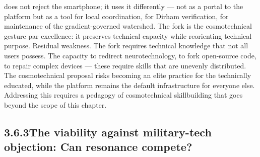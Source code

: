 does not reject the smartphone; it uses it differently — not as a portal to the platform but as a tool for local coordination, for Dirham verification, for maintenance of the gradient-governed watershed. The fork is the cosmotechnical gesture par excellence: it preserves technical capacity while reorienting technical purpose. Residual weakness. The fork requires technical knowledge that not all users possess. The capacity to redirect neurotechnology, to fork open-source code, to repair complex devices — these require skills that are unevenly distributed. The cosmotechnical proposal risks becoming an elite practice for the technically educated, while the platform remains the default infrastructure for everyone else. Addressing this requires a pedagogy of cosmotechnical skillbuilding that goes beyond the scope of this chapter.

\subsection{3.6.3\quad The viability against military-tech objection: Can resonance compete?}

